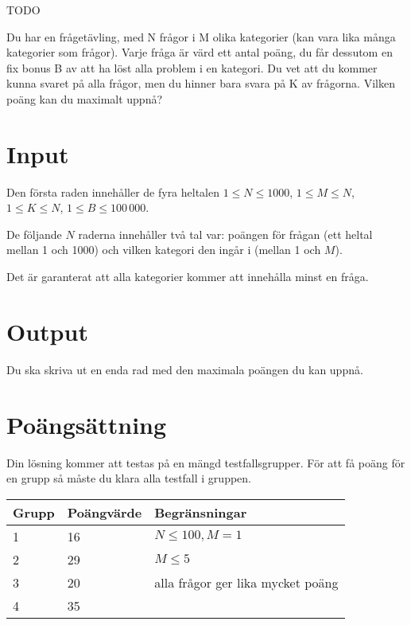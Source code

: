 
TODO

Du har en frågetävling, med N frågor i M olika kategorier (kan vara lika många kategorier som frågor).
Varje fråga är värd ett antal poäng, du får dessutom en fix bonus B av att ha löst alla problem i en kategori.
Du vet att du kommer kunna svaret på alla frågor, men du hinner bara svara på K av frågorna. Vilken poäng kan du maximalt uppnå?

\section*{Input}
Den första raden innehåller de fyra heltalen $1 \le N \le 1000$, $1 \le M \le N$, $1 \le K \le N$, $1 \le B \le 100\,000$.

De följande $N$ raderna innehåller två tal var: poängen för frågan (ett heltal mellan 1 och 1000) och vilken kategori den ingår i (mellan 1 och $M$).

Det är garanterat att alla kategorier kommer att innehålla minst en fråga.

\section*{Output}
Du ska skriva ut en enda rad med den maximala poängen du kan uppnå.

\section*{Poängsättning}
Din lösning kommer att testas på en mängd testfallsgrupper. För att få poäng för en grupp så måste du klara alla testfall i gruppen.

\begin{tabular}{| l | l | l |}
  \hline
  Grupp & Poängvärde & Begränsningar\\ \hline
  1     & 16         & $N \le 100, M = 1$ \\ \hline
  2     & 29         & $M \le 5$ \\ \hline
  3     & 20         & alla frågor ger lika mycket poäng \\ \hline
  4     & 35         & \\ \hline
\end{tabular}
